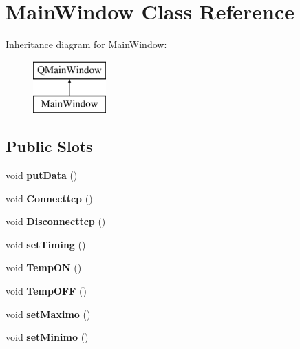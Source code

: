 \hypertarget{class_main_window}{}\section{Main\+Window Class Reference}
\label{class_main_window}
Inheritance diagram for Main\+Window\+:\begin{figure}[H]
\begin{center}
\leavevmode
\includegraphics[height=2.000000cm]{class_main_window}
\end{center}
\end{figure}
\subsection*{Public Slots}
\begin{DoxyCompactItemize}
\item 
\mbox{\label{class_main_window_afdfeb13ec363b0eb8ecacaf0aa13b605}} 
void {\bfseries put\+Data} ()
\item 
\mbox{\label{class_main_window_aea419351969ceb1745bce8c32cc40898}} 
void {\bfseries Connecttcp} ()
\item 
\mbox{\label{class_main_window_ad194178551f1276153573dadbd16cfe4}} 
void {\bfseries Disconnecttcp} ()
\item 
\mbox{\label{class_main_window_a380872c4aa4095322c798c8ea0ed357e}} 
void {\bfseries set\+Timing} ()
\item 
\mbox{\label{class_main_window_a6c6f436be38f1b757ca1378596e4f65d}} 
void {\bfseries Temp\+ON} ()
\item 
\mbox{\label{class_main_window_a4c7f4a0aea66c32ce97ad252109b4247}} 
void {\bfseries Temp\+O\+FF} ()
\item 
\mbox{\label{class_main_window_a748efcbe7c110e645ecebf7aae442879}} 
void {\bfseries set\+Maximo} ()
\item 
\mbox{\label{class_main_window_a65f18a0fb5579ff98e4f95aab314cf88}} 
void {\bfseries set\+Minimo} ()
\end{DoxyCompactItemize}
